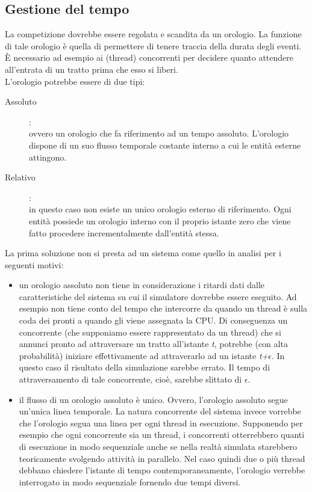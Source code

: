 \label{analisi_soluzioni}
\subsection{Gestione del tempo}
\label{tempo}
La competizione dovrebbe essere regolata e scandita da un orologio. La funzione
di tale orologio è quella di permettere
di tenere traccia della durata degli eventi. \`{E} necessario ad esempio ai
(thread) concorrenti per decidere quanto attendere all'entrata
di un tratto prima che esso si liberi.\\
L'orologio potrebbe essere di due tipi:
\begin{description}
\item[Assoluto]:\\
ovvero un orologio che fa riferimento ad un tempo assoluto. L'orologio dispone
di un suo flusso temporale costante 
interno a cui le entità esterne attingono.
\item[Relativo]:\\
in questo caso non esiste un unico orologio esterno di riferimento. Ogni entità
possiede un orologio interno con il proprio istante
zero che viene fatto procedere incrementalmente dall'entità stessa.
\end{description}
La prima soluzione non si presta ad un sistema come quello in analisi per i
seguenti motivi:
\begin{itemize}
\item un orologio assoluto non tiene in considerazione i ritardi dati dalle
caratteristiche del sistema su cui il simulatore dovrebbe
essere eseguito. Ad esempio non tiene conto del tempo che intercorre da quando
un thread è sulla coda dei pronti a quando gli viene assegnata la CPU.
Di conseguenza un concorrente (che supponiamo essere rappresentato da un thread)
che si annunci pronto ad attraversare un tratto all'istante
\emph{t}, potrebbe (con alta probabilità) iniziare effettivamente ad
attraverarlo ad un istante \emph{t+$\epsilon$}. In questo caso
il risultato della simulazione sarebbe errato. Il tempo di attraversamento di
tale concorrente, cioè, sarebbe slittato di $\epsilon$.
\item il flusso di un orologio assoluto è unico. Ovvero, l'orologio assoluto
segue un'unica linea temporale. La natura concorrente del sistema
invece vorrebbe che l'orologio segua una linea per ogni thread in esecuzione.
Supponendo per esempio che ogni concorrente sia un thread,
i concorrenti otterrebbero quanti di esecuzione in modo sequenziale anche se
nella realtà simulata starebbero teoricamente svolgendo
attività in parallelo. Nel caso quindi due o più thread debbano chiedere
l'istante di tempo contemporaneamente, 
l'orologio verrebbe interrogato in modo sequenziale fornendo due tempi diversi.
\end{itemize}
